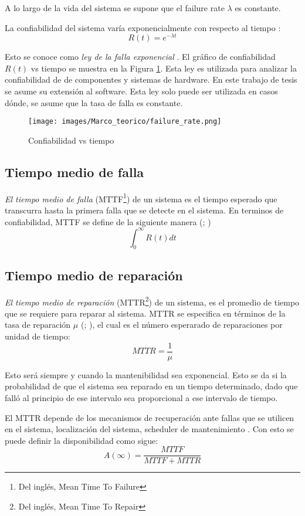 A lo largo de la vida del sistema se supone que el failure rate $\lambda$ es constante. 

La confiabilidad del sistema varía exponencialmente con respecto al tiempo \citep{FTDesign}: $$R(t) = e^{- \lambda t}$$

Esto se conoce como \textit{ley de la falla exponencial} \citep{FTDesign}. El gráfico de confiabilidad $R(t)$ vs tiempo se muestra en la Figura \ref{fig:failure_rate}. Esta ley es utilizada para analizar la confiabilidad de de componentes y sistemas de hardware. En este trabajo de tesis se asume su extensión al software. Esta ley solo puede ser utilizada en casos dónde, se asume que la tasa de falla es constante. \citep{FTDesign}

\begin{figure}[h]
 \centering
 \texttt{[image: images/Marco\_teorico/failure\_rate.png]}
  \caption{Confiabilidad vs tiempo }
\label{fig:failure_rate}
\end{figure}

\subsection{Tiempo medio de falla}
\textit{El tiempo medio de falla} (MTTF\footnote{Del inglés, Mean Time To Failure}) de un sistema es el tiempo esperado que transcurra hasta la primera falla que se
detecte en el sistema. En terminos de confiabilidad, MTTF se define de la siguiente manera (\citep{FTDesign}; \citep{Rausand04}) $$\int_0^{\infty} R(t) dt$$

\subsection{Tiempo medio de reparación}
\textit{El tiempo medio de reparación} (MTTR\footnote{Del inglés, Mean Time To Repair})
de un sistema, es el promedio de tiempo que se requiere para reparar al sistema.
MTTR se especifica en términos de la tasa de reparación $\mu$ (\citep{FTDesign}; \citep{Rausand04}), el cual es el número esperarado de reparaciones por unidad de tiempo: $$MTTR = \frac{1}{\mu}$$

Esto será siempre y cuando la mantenibilidad sea exponencial. Esto se da si la probabilidad de que el sistema sea reparado en un tiempo determinado, dado que falló al principio de ese intervalo sea proporcional a ese intervalo de tiempo.

El MTTR depende de los mecanismos de recuperación ante fallas que se utilicen en el sistema, localización del sistema, scheduler de mantenimiento \citep{FTDesign}. Con esto se puede definir la disponibilidad como sigue: $$A(\infty) = \frac{MTTF}{MTTF+MTTR}$$

